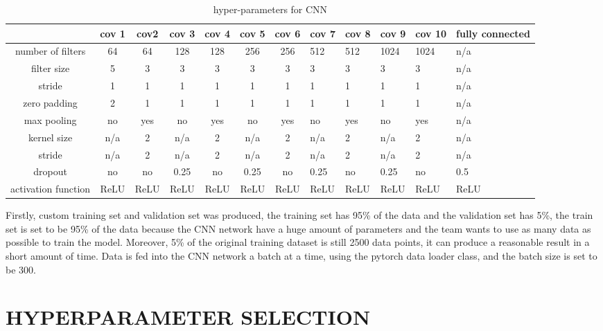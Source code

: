 \documentclass[letterpaper, 10 pt, conference]{ieeeconf}  %
\begin{document}
\begin{table}[t]
	\centering
	\caption{hyper-parameters for CNN}
	\label{tab:hyperparams}
	\begin{tabular}{|c|c|c|c|c|c|c|l|l|l|l|l|}
		\hline
	&cov 1	&cov2	&cov 3	&cov 4	&cov 5	&cov 6	&cov 7&	cov 8&	cov 9	&cov 10&	fully connected\\\hline
number of filters&	64	&64	&128	&128	&256	&256	&512	&512&	1024	&1024	&n/a \\\hline
filter size&5&3	&3	&3	&3	&3	&3	&3	&3	&3	&n/a\\\hline
stride	&1	&1	&1	&1	&1	&1	&1	&1	&1	&1	&n/a\\\hline
zero padding &2	&1	&1	&1	&1	&1	&1	&1	&1	&1	&n/a\\\hline
max pooling	&no&	yes&	no&	yes&	no&	yes&	no&	yes&	no	&yes&n/a\\\hline
kernel size&	n/a&	2&	n/a&	2&	n/a&	2	&n/a	&2	&n/a&2&n/a\\\hline
stride	&n/a&2&	n/a	&2	&n/a&2	&n/a&2	&n/a&2&	n/a\\\hline
dropout	&no&	no&	0.25&	no	&0.25&	no&	0.25&no&0.25&no&0.5\\\hline
activation function &	ReLU&	ReLU&	ReLU&	ReLU&	ReLU&	ReLU&	ReLU&	ReLU	&ReLU&	ReLU&	ReLU\\\hline
\end{tabular}
\end{table}
Firstly, custom training set and validation set was produced, the training set has 95\% of the data and the validation set has 5\%, the train set is set to be 95\% of the data because the CNN network have a huge amount of parameters and the team wants to use as many data as possible to train the model. Moreover, 5\% of the original training dataset is still 2500 data points, it can produce a reasonable result in a short amount of time. 
Data is fed into the CNN network a batch at a time, using the pytorch data loader class, and the batch size is set to be 300.


\section{HYPERPARAMETER SELECTION}
\end{document}
